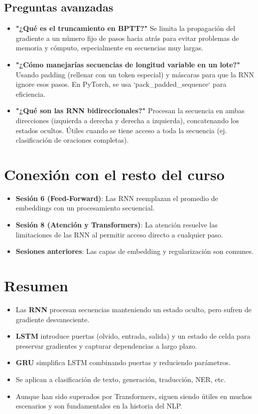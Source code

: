 \documentclass[12pt,a4paper,openany,oneside]{book}
\begin{document}
\subsection{Preguntas avanzadas}
\begin{itemize}
    \item \textbf{"¿Qué es el truncamiento en BPTT?"}
    Se limita la propagación del gradiente a un número fijo de pasos hacia atrás para evitar problemas de memoria y cómputo, especialmente en secuencias muy largas.
    
    \item \textbf{"¿Cómo manejarías secuencias de longitud variable en un lote?"}
    Usando padding (rellenar con un token especial) y máscaras para que la RNN ignore esos pasos. En PyTorch, se usa `pack_padded_sequence` para eficiencia.
    
    \item \textbf{"¿Qué son las RNN bidireccionales?"}
    Procesan la secuencia en ambas direcciones (izquierda a derecha y derecha a izquierda), concatenando los estados ocultos. Útiles cuando se tiene acceso a toda la secuencia (ej. clasificación de oraciones completas).
\end{itemize}

\section{Conexión con el resto del curso}
\begin{itemize}
    \item \textbf{Sesión 6 (Feed-Forward)}: Las RNN reemplazan el promedio de embeddings con un procesamiento secuencial.
    \item \textbf{Sesión 8 (Atención y Transformers)}: La atención resuelve las limitaciones de las RNN al permitir acceso directo a cualquier paso.
    \item \textbf{Sesiones anteriores}: Las capas de embedding y regularización son comunes.
\end{itemize}

\section{Resumen}
\begin{itemize}
    \item Las \textbf{RNN} procesan secuencias manteniendo un estado oculto, pero sufren de gradiente desvaneciente.
    \item \textbf{LSTM} introduce puertas (olvido, entrada, salida) y un estado de celda para preservar gradientes y capturar dependencias a largo plazo.
    \item \textbf{GRU} simplifica LSTM combinando puertas y reduciendo parámetros.
    \item Se aplican a clasificación de texto, generación, traducción, NER, etc.
    \item Aunque han sido superados por Transformers, siguen siendo útiles en muchos escenarios y son fundamentales en la historia del NLP.
\end{itemize}
\end{document}
